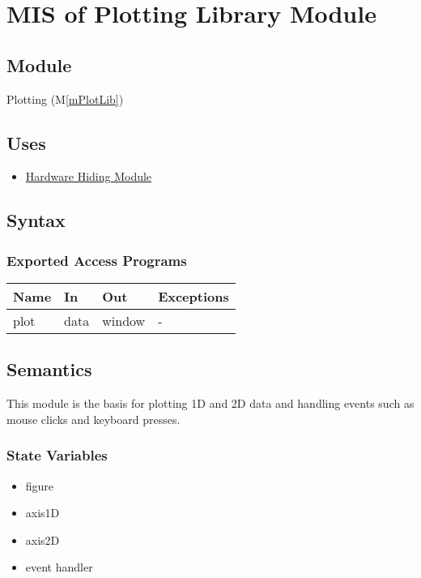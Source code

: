 \documentclass[12pt, titlepage]{article}
\newcommand{\mref}[1]{M\ref{#1}}
\begin{document}
\newpage
\section{MIS of Plotting Library Module} \label{Mod:Plotting}

\subsection{Module}

Plotting (\mref{mPlotLib})

\subsection{Uses}
\begin{itemize}
    \item \hyperref[Mod:HH]{Hardware Hiding Module}
\end{itemize}

\subsection{Syntax}

\subsubsection{Exported Access Programs}

\begin{center}
    \begin{tabular}{p{2cm} p{4cm} p{4cm} p{2cm}}
        \hline
        \textbf{Name} & \textbf{In} & \textbf{Out} & \textbf{Exceptions} \\
        \hline
        plot & data & window & - \\
        \hline
    \end{tabular}
\end{center}

\subsection{Semantics}
This module is the basis for plotting 1D and 2D data and handling events such as
mouse clicks and keyboard presses.

\subsubsection{State Variables}
\begin{itemize}
    \item figure
    \item axis1D
    \item axis2D
    \item event handler
\end{itemize}
\end{document}
